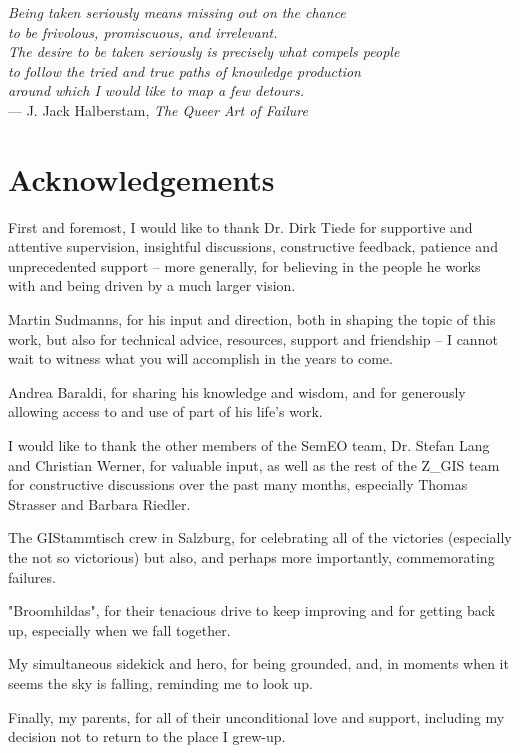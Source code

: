 \cleardoublepage
{}

\begin{flushright}{\slshape
    Being taken seriously means missing out on the chance \\
    to be frivolous, promiscuous, and irrelevant. \\
    The desire to be taken seriously is precisely what compels people \\
    to follow the tried and true paths of knowledge production \\
    around which I would like to map a few detours.} \\ \medskip
    --- J. Jack Halberstam, \emph{The Queer Art of Failure}
\end{flushright}



\bigskip

\begingroup
\let\clearpage\relax
\let\cleardoublepage\relax
\let\cleardoublepage\relax
\chapter*{Acknowledgements}
First and foremost, I would like to thank Dr. Dirk Tiede for supportive and attentive supervision, insightful discussions, constructive feedback, patience and unprecedented support -- more generally, for believing in the people he works with and being driven by a much larger vision.

Martin Sudmanns, for his input and direction, both in shaping the topic of this work, but also for technical advice, resources, support and friendship -- I cannot wait to witness what you will accomplish in the years to come.

Andrea Baraldi, for sharing his knowledge and wisdom, and for generously allowing access to and use of part of his life's work.

I would like to thank the other members of the SemEO team, Dr. Stefan Lang and Christian Werner, for valuable input, as well as the rest of the Z\_GIS team for constructive discussions over the past many months, especially Thomas Strasser and Barbara Riedler.

The GIStammtisch crew in Salzburg, for celebrating all of the victories (especially the not so victorious) but also, and perhaps more importantly, commemorating failures.

"Broomhildas", for their tenacious drive to keep improving and for getting back up, especially when we fall together.

My simultaneous sidekick and hero, for being grounded, and, in moments when it seems the sky is falling, reminding me to look up.

Finally, my parents, for all of their unconditional love and support, including my decision not to return to the place I grew-up.

\endgroup
